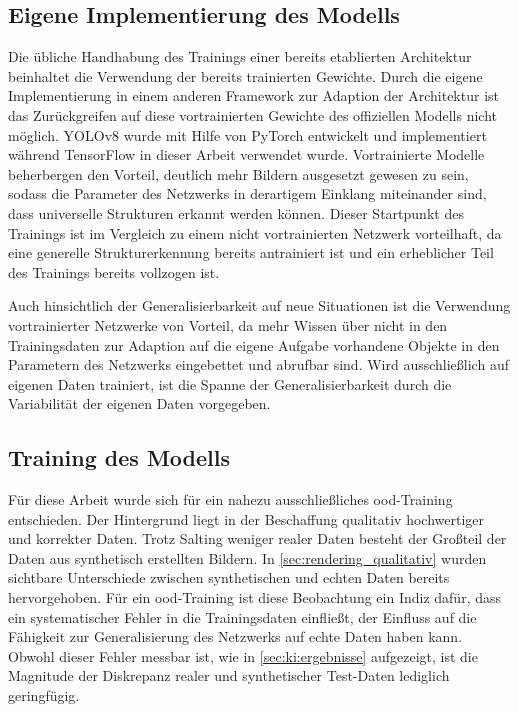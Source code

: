 \subsection{Eigene Implementierung des Modells}

Die übliche Handhabung des Trainings einer bereits etablierten Architektur beinhaltet die Verwendung der bereits trainierten Gewichte. Durch die eigene Implementierung in einem anderen Framework zur Adaption der Architektur ist das Zurückgreifen auf diese vortrainierten Gewichte des offiziellen Modells nicht möglich. YOLOv8 wurde mit Hilfe von PyTorch entwickelt und implementiert während TensorFlow in dieser Arbeit verwendet wurde. Vortrainierte Modelle beherbergen den Vorteil, deutlich mehr Bildern ausgesetzt gewesen zu sein, sodass die Parameter des Netzwerks in derartigem Einklang miteinander sind, dass universelle Strukturen erkannt werden können. Dieser Startpunkt des Trainings ist im Vergleich zu einem nicht vortrainierten Netzwerk vorteilhaft, da eine generelle Strukturerkennung bereits antrainiert ist und ein erheblicher Teil des Trainings bereits vollzogen ist.

Auch hinsichtlich der Generalisierbarkeit auf neue Situationen ist die Verwendung vortrainierter Netzwerke von Vorteil, da mehr Wissen über nicht in den Trainingsdaten zur Adaption auf die eigene Aufgabe vorhandene Objekte in den Parametern des Netzwerks eingebettet und abrufbar sind. Wird ausschließlich auf eigenen Daten trainiert, ist die Spanne der Generalisierbarkeit durch die Variabilität der eigenen Daten vorgegeben.


\subsection{Training des Modells}

Für diese Arbeit wurde sich für ein nahezu ausschließliches \ac{ood}-Training entschieden. Der Hintergrund liegt in der Beschaffung qualitativ hochwertiger und korrekter Daten. Trotz Salting weniger realer Daten besteht der Großteil der Daten aus synthetisch erstellten Bildern. In \autoref{sec:rendering_qualitativ} wurden sichtbare Unterschiede zwischen synthetischen und echten Daten bereits hervorgehoben. Für ein \ac{ood}-Training ist diese Beobachtung ein Indiz dafür, dass ein systematischer Fehler in die Trainingsdaten einfließt, der Einfluss auf die Fähigkeit zur Generalisierung des Netzwerks auf echte Daten haben kann. Obwohl dieser Fehler messbar ist, wie in \autoref{sec:ki:ergebnisse} aufgezeigt, ist die Magnitude der Diskrepanz realer und synthetischer Test-Daten lediglich geringfügig.

